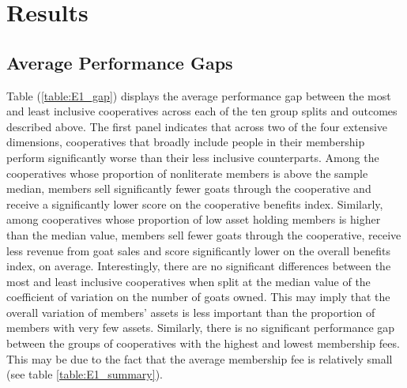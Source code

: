 \documentclass[11pt]{article}
\begin{document}
\section{Results}

\subsection{Average Performance Gaps}

Table (\ref{table:E1_gap}) displays the average performance gap between the most and least inclusive cooperatives across each of the ten group splits and outcomes described above. The first panel indicates that across two of the four extensive dimensions, cooperatives that broadly include people in their membership perform significantly worse than their less inclusive counterparts. Among the cooperatives whose proportion of nonliterate members is above the sample median, members sell significantly fewer goats through the cooperative and receive a significantly lower score on the cooperative benefits index. Similarly, among cooperatives whose proportion of low asset holding members is higher than the median value, members sell fewer goats through the cooperative, receive less revenue from goat sales and score significantly lower on the overall benefits index, on average. Interestingly, there are no significant differences between the most and least inclusive cooperatives when split at the median value of the coefficient of variation on the number of goats owned. This may imply that the overall variation of members' assets is less important than the proportion of members with very few assets. Similarly, there is no significant performance gap between the groups of cooperatives with the highest and lowest membership fees. This may be due to the fact that the average membership fee is relatively small (see table \ref{table:E1_summary}). 
\end{document}
